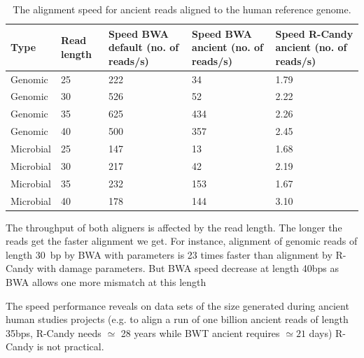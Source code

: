 \documentclass[11pt,a4paper]{report}
\begin{document}
\begin{table}[H]
  \begin{tabular}{ |  p{2cm} | p{2cm} | p{2cm} | p{2cm} |p{2cm} | }
    \hline
  	\textbf{Type} & \textbf{Read length }&\textbf{Speed BWA  
  		default (no. of reads/s) }
  	&\textbf{Speed BWA ancient (no. of reads/s)} 
  	& \textbf{Speed R-Candy ancient (no. of reads/s)}\\ \hline
 	  Genomic    & 25  & 222 &  34   &  1.79 \\ \hline
      Genomic    & 30  & 526 &  52   &  2.22 \\ \hline
      Genomic    & 35  & 625 &  434   &  2.26 \\ \hline
 	  Genomic	 & 40  & 500 &  357   &  2.45 \\ \hline
 	  Microbial  & 25  & 147 &  13   &  1.68 \\ \hline
      Microbial  & 30  & 217 &  42   &  2.19 \\ \hline
 	  Microbial  & 35  & 232 &  153   &  1.67 \\ \hline
 	  Microbial  & 40  & 178 &  144   &  3.10 \\ \hline
   \end{tabular}
\caption{The alignment speed for ancient reads aligned to 
the human reference genome.}
\label{speed-RG}
\end{table}

The throughput of both aligners is affected by the read length.  The
longer the reads get the faster alignment we get.  For instance,
alignment of genomic reads of length 30~bp by BWA with 
parameters is 23 times faster than alignment by R-Candy with damage
parameters.  But BWA speed decrease at length 40bps as BWA allows one
more mismatch at this length

The speed performance reveals on data sets of the size generated 
during ancient human studies projects (e.g. to align a run of one 
billion ancient reads of length 35bps, R-Candy needs $\simeq $ 28 years while 
BWT ancient requires $\simeq 21$ days) R-Candy is not practical.
\end{document}
